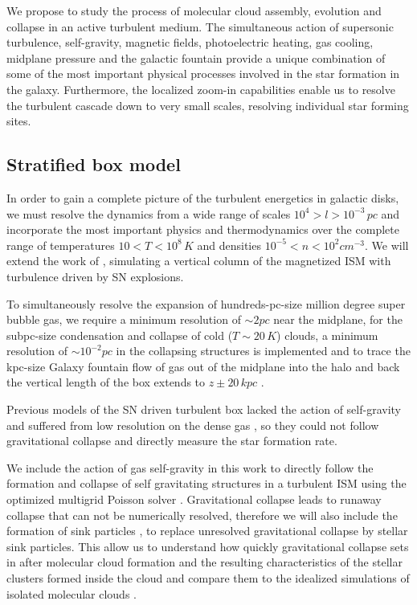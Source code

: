 \documentclass[12pt,a4paper]{article}
\begin{document}
We propose to study the process of molecular cloud assembly, evolution and collapse in an active turbulent medium. 
The simultaneous action of supersonic turbulence, self-gravity, magnetic fields, photoelectric heating, gas cooling, midplane pressure and the galactic fountain provide a unique combination of some of the most important physical processes involved in the star formation in the galaxy.
Furthermore, the localized zoom-in capabilities enable us to resolve the turbulent cascade down to very small scales, resolving individual star forming sites.


\subsection{Stratified box model}

In order to gain a complete picture of the turbulent energetics in galactic disks, we must resolve the dynamics from a wide range of scales $10^{4} > l > 10^{-3} \, pc$ and incorporate the most important physics and thermodynamics over the complete range of temperatures $10 < T < 10^{8} \, K$ and densities $10^{-5} < n < 10^{2} cm^{-3}$.
We will extend the work of \citet{JoungMacLow2006,Joung2009, Hill2012}, simulating a vertical column of the magnetized ISM with turbulence driven by SN explosions.                            
	                                                                                                                                                                                    
To simultaneously resolve the expansion of hundreds-pc-size million degree super bubble gas, we require a minimum resolution of $\sim 2 pc$ near the midplane, for the subpc-size condensation and collapse of cold ($T \sim 20 \, K$) clouds, a minimum resolution of $\sim 10^{-2} pc$ in the collapsing structures is implemented and to trace the kpc-size Galaxy fountain flow of gas out of the midplane into the halo and back the vertical length of the box extends to $z \pm 20 \, kpc$ \citep{Avillez&Breitschwerdt2004, Joung2012, Hill2012}.
	
Previous models of the SN driven turbulent box lacked the action of self-gravity and suffered from low resolution on the dense gas \citet{JoungMacLow2006,Joung2009, Hill2012}, so they could not follow gravitational collapse and directly measure the star formation rate.
	
We include the action of gas self-gravity in this work to directly follow the formation and collapse of self gravitating structures in a turbulent ISM using the optimized multigrid Poisson solver \cite{Daley2012}.
Gravitational collapse leads to runaway collapse that can not be numerically resolved, therefore we will also include the formation of sink particles \citep{Bate95, Federrath2010}, to replace unresolved gravitational collapse by stellar sink particles.
This allow us to understand how quickly gravitational collapse sets in after molecular cloud formation and the resulting characteristics of the stellar clusters formed inside the cloud and compare them to the idealized simulations of isolated molecular clouds \citep{Dale2014, Girichidis2011, Bate2009}.
\end{document}
